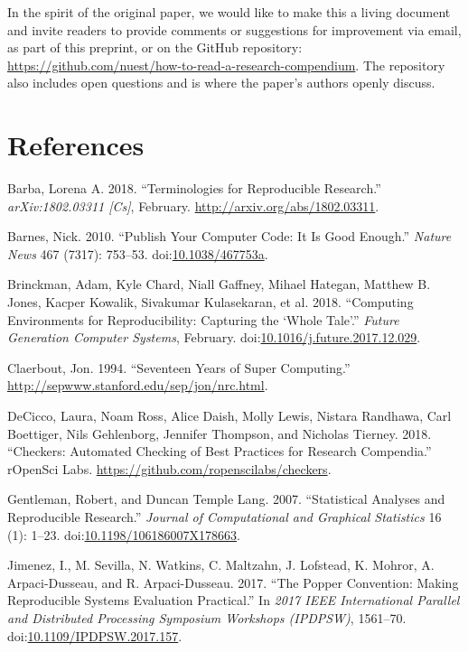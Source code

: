 \documentclass[fleqn,10pt]{wlpeerj} %
\begin{document}
In the spirit of the original paper, we would like to make this a living
document and invite readers to provide comments or suggestions for
improvement via email, as part of this preprint, or on the GitHub
repository:
\url{https://github.com/nuest/how-to-read-a-research-compendium}. The
repository also includes open questions and is where the paper's authors
openly discuss.

\section*{References}\label{references}

\hypertarget{refs}{}
\hypertarget{ref-barba_terminologies_2018}{}
Barba, Lorena A. 2018. ``Terminologies for Reproducible Research.''
\emph{arXiv:1802.03311 {[}Cs{]}}, February.
\url{http://arxiv.org/abs/1802.03311}.

\hypertarget{ref-barnes_publish_2010}{}
Barnes, Nick. 2010. ``Publish Your Computer Code: It Is Good Enough.''
\emph{Nature News} 467 (7317): 753--53.
doi:\href{https://doi.org/10.1038/467753a}{10.1038/467753a}.

\hypertarget{ref-brinckman_computing_2018}{}
Brinckman, Adam, Kyle Chard, Niall Gaffney, Mihael Hategan, Matthew B.
Jones, Kacper Kowalik, Sivakumar Kulasekaran, et al. 2018. ``Computing
Environments for Reproducibility: Capturing the `Whole Tale'.''
\emph{Future Generation Computer Systems}, February.
doi:\href{https://doi.org/10.1016/j.future.2017.12.029}{10.1016/j.future.2017.12.029}.

\hypertarget{ref-claerbout_seventeen_1994}{}
Claerbout, Jon. 1994. ``Seventeen Years of Super Computing.''
\url{http://sepwww.stanford.edu/sep/jon/nrc.html}.

\hypertarget{ref-decicco_checkers:_2018}{}
DeCicco, Laura, Noam Ross, Alice Daish, Molly Lewis, Nistara Randhawa,
Carl Boettiger, Nils Gehlenborg, Jennifer Thompson, and Nicholas
Tierney. 2018. ``Checkers: Automated Checking of Best Practices for
Research Compendia.'' rOpenSci Labs.
\url{https://github.com/ropenscilabs/checkers}.

\hypertarget{ref-gentleman_statistical_2007}{}
Gentleman, Robert, and Duncan Temple Lang. 2007. ``Statistical Analyses
and Reproducible Research.'' \emph{Journal of Computational and
Graphical Statistics} 16 (1): 1--23.
doi:\href{https://doi.org/10.1198/106186007X178663}{10.1198/106186007X178663}.

\hypertarget{ref-jimenez_popper_2017}{}
Jimenez, I., M. Sevilla, N. Watkins, C. Maltzahn, J. Lofstead, K.
Mohror, A. Arpaci-Dusseau, and R. Arpaci-Dusseau. 2017. ``The Popper
Convention: Making Reproducible Systems Evaluation Practical.'' In
\emph{2017 IEEE International Parallel and Distributed Processing
Symposium Workshops (IPDPSW)}, 1561--70.
doi:\href{https://doi.org/10.1109/IPDPSW.2017.157}{10.1109/IPDPSW.2017.157}.
\end{document}
